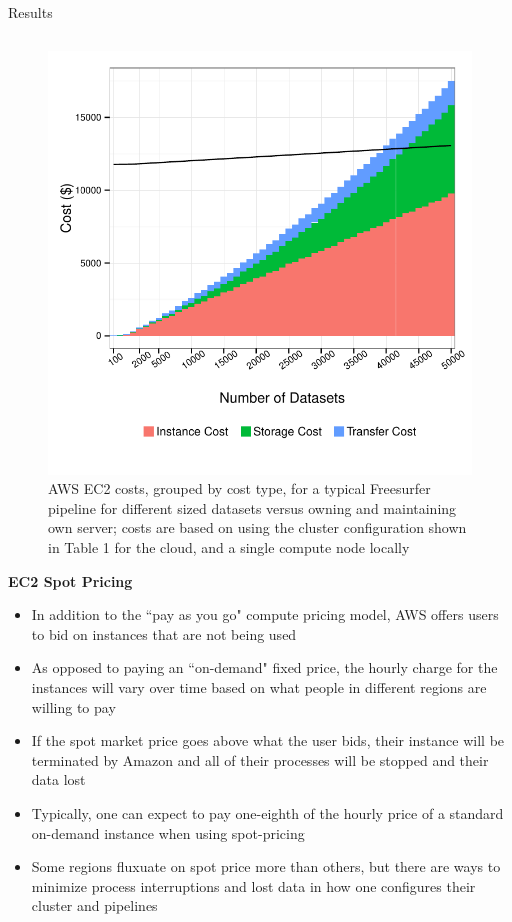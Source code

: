 \documentclass[final,hyperref={pdfpagelabels=false}]{beamer}
\begin{document}
\begin{frame}
\begin{columns}
\begin{column}{.5\textwidth}
{\begin{block}{Results}
\begin{column}{.47\textwidth}
\begin{figure}
                  \includegraphics[width=.99\textwidth]{fs-costs.pdf}
                  \caption{\label{fig:fs-costs}AWS EC2 costs, grouped by cost type, for a typical Freesurfer pipeline for different sized datasets versus owning and maintaining own server; costs are based on using the cluster configuration shown in Table 1 for the cloud, and a single compute node locally}
              \end{figure}
              {\bf EC2 Spot Pricing}
              \begin{itemize}
                  \item In addition to the ``pay as you go" compute pricing model, AWS offers users to bid on instances that are not being used
                  \item As opposed to paying an ``on-demand" fixed price, the hourly charge for the instances will vary over time based on what people in different regions are willing to pay
                  \item If the spot market price goes above what the user bids, their instance will be terminated by Amazon and all of their processes will be stopped and their data lost
                  \item Typically, one can expect to pay one-eighth of the hourly price of a standard on-demand instance when using spot-pricing
                  \item Some regions fluxuate on spot price more than others, but there are ways to minimize process interruptions and lost data in how one configures their cluster and pipelines

\end{itemize}
\end{column}
\end{block}}
\end{column}
\end{columns}
\end{frame}
\end{document}
